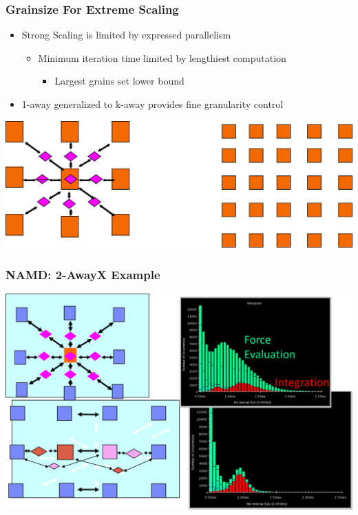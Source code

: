 \begin{frame}[fragile]
\frametitle{Grainsize For Extreme Scaling}
\begin{itemize}
 \item Strong Scaling is limited by expressed parallelism
 \begin{itemize}
  \item Minimum iteration time limited by lengthiest computation
  \begin {itemize} 
    \item Largest grains set lower bound
  \end{itemize}
 \end{itemize}
 \item 1-away generalized to k-away provides fine granularity control
\end{itemize}
\begin{centering}
\includegraphics[width=1.0\textwidth]{figures/1away2away}
\end{centering}
\end{frame}

\begin{frame}[fragile]
\frametitle{NAMD: 2-AwayX Example}
\begin{centering}
\includegraphics[width=1.0\textwidth]{figures/2awayDiagramPlusHistos}
\end{centering}
\end{frame}

